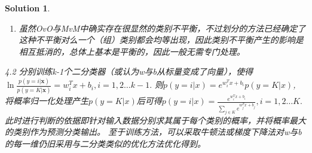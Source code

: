 \documentclass[a4paper,UTF8]{article}
\numberwithin{equation}{section}
\newtheorem*{solution}{Solution}
\begin{document}
\begin{solution}
\begin{enumerate}[(1)]
\begin{enumerate}[1)]
			\end{enumerate}
			\item 虽然OvO与MvM中确实存在很显然的类别不平衡，不过划分的方法已经确定了这种不平衡对么一个（组）类别都会均等出现，因此类别不平衡产生的影响是相互抵消的，总体上基本是平衡的，因此一般无需专门处理。
	\end{enumerate}
	4.2 分别训练k-1个二分类器（或认为w与b从标量变成了向量），使得$\ln\frac{p(y=i|\mathbf{x})}{p(y=K|\mathbf{x})}=w_i^Tx+b_i,i=1,2 \dots k-1.$ 则$p(y=i|x)=e^{w_i^Tx+b_i}p(y=K|x)$, 将概率归一化处理产生$p(y=K|x)$后可得$p(y=i|x)=\frac{e^{w_i^Tx+b_i}}{\sum\limits_{j \in K}e^{w_j^Tx+b_j}},i=1,2\dots K.$ 此时进行判断的依据即针对输入数据分别求其属于每个类别的概率，并将概率最大的类别作为预测分类输出。
		至于训练方法，可以采取牛顿法或梯度下降法对w与b的每一维仍旧采用与二分类类似的优化方法优化得到。
\end{solution}


\end{document}
